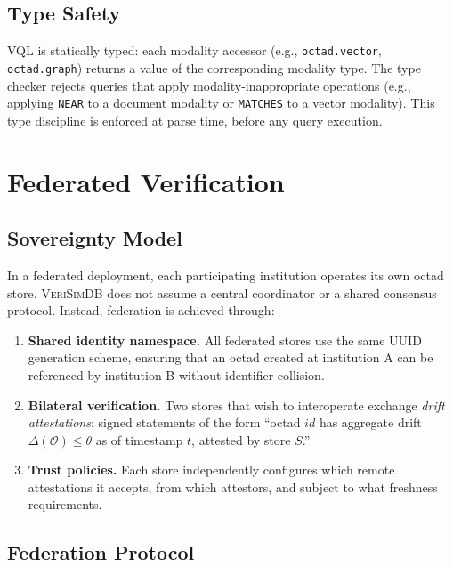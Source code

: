 \documentclass[11pt,twocolumn]{article}
\newcommand{\verisimdb}{\textsc{VeriSimDB}\xspace}
\newcommand{\octad}{\mathcal{O}}
\newcommand{\driftfn}{\Delta}
\begin{document}
\subsection{Type Safety}

VQL is statically typed: each modality accessor (e.g., \texttt{octad.vector},
\texttt{octad.graph}) returns a value of the corresponding modality type.
The type checker rejects queries that apply modality-inappropriate operations
(e.g., applying \texttt{NEAR} to a document modality or \texttt{MATCHES} to
a vector modality).  This type discipline is enforced at parse time, before
any query execution.

\section{Federated Verification}\label{sec:federation}

\subsection{Sovereignty Model}

In a federated deployment, each participating institution operates its own
octad store.  \verisimdb does not assume a central coordinator or a shared
consensus protocol.  Instead, federation is achieved through:

\begin{enumerate}[leftmargin=*]
  \item \textbf{Shared identity namespace.}  All federated stores use the
    same UUID generation scheme, ensuring that an octad created at
    institution A can be referenced by institution B without identifier
    collision.
  \item \textbf{Bilateral verification.}  Two stores that wish to
    interoperate exchange \emph{drift attestations}: signed statements of
    the form ``octad $\mathit{id}$ has aggregate drift $\driftfn(\octad)
    \leq \theta$ as of timestamp $t$, attested by store $S$.''
  \item \textbf{Trust policies.}  Each store independently configures
    which remote attestations it accepts, from which attestors, and
    subject to what freshness requirements.
\end{enumerate}

\subsection{Federation Protocol}
\end{document}
